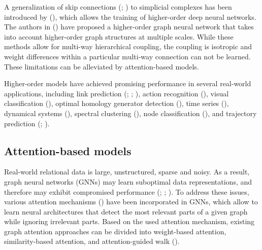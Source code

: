 \documentclass[
  12pt,
]{krantz}
\begin{document}
A generalization of skip connections
(;
) to simplicial complexes has
been introduced by (), which allows the training of higher-order deep neural
networks. The authors in () have proposed a higher-order graph neural network that takes
into account higher-order graph structures at multiple scales. While
these methods allow for multi-way hierarchical coupling, the coupling is
isotropic and weight differences within a particular multi-way
connection can not be learned. These limitations can be alleviated by
attention-based models.

Higher-order models have achieved promising performance in several
real-world applications, including link prediction
(;
; ),
action recognition (),
visual classification (), optimal homology generator detection
(), time
series (),
dynamical systems (), spectral clustering
(),
node classification (), and trajectory prediction
(;
).

\subsection{Attention-based models}\label{attention-based-models}

Real-world relational data is large, unstructured, sparse and noisy. As
a result, graph neural networks (GNNs) may learn suboptimal data
representations, and therefore may exhibit compromised performance
(;
;
). To address
these issues, various attention mechanisms
() have been
incorporated in GNNs, which allow to learn neural architectures that
detect the most relevant parts of a given graph while ignoring
irrelevant parts. Based on the used attention mechanism, existing graph
attention approaches can be divided into weight-based attention,
similarity-based attention, and attention-guided walk
().
\end{document}
